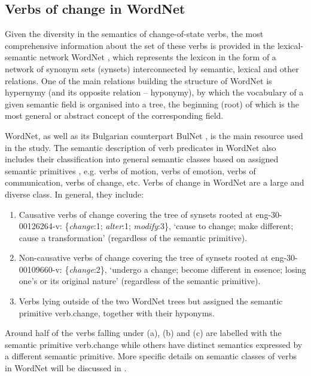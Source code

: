 \documentclass[output=paper,colorlinks,citecolor=brown]{langscibook}
\begin{document}
\subsection{Verbs of change in WordNet}\label{sec:wordnet}

Given the diversity in the semantics of change-of-state verbs, the most comprehensive information about the set of these verbs is provided in the lexical-semantic network WordNet \citep{Miller1995,Fellbaum1998}, which represents the lexicon in the form of a network of synonym sets (synsets) interconnected by semantic, lexical and other relations. One of the main relations building the structure of WordNet is hypernymy (and its opposite relation -- hyponymy), by which the vocabulary of a given semantic field is organised into a tree, the beginning (root) of which is the most general or abstract concept of the corresponding field.

WordNet, as well as its Bulgarian counterpart BulNet \citep{Koeva2006,koeva2021-wordnet}, is the main resource used in the study. The semantic description of verb predicates in WordNet also includes their classification into general semantic classes based on assigned semantic primitives \citep{MillerFellbaum2007}, e.g. verbs of motion, verbs of emotion, verbs of communication, verbs of change, etc. Verbs of change in WordNet are a large and diverse class. In general, they include:

\begin{enumerate}[label=(\alph*)]
\item Causative verbs of change covering the tree of synsets rooted at eng-30-00126264-v: \{\textit{change}:1; \textit{alter}:1; \textit{modify}:3\}, `cause to change; make different; cause a transformation' (regardless of the semantic primitive).
\item Non-causative verbs of change covering the tree of synsets rooted at eng-30-00109660-v: \{\textit{change}:2\}, `undergo a change; become different in essence; losing one's or its original nature’ (regardless of the semantic primitive).
\item Verbs lying outside of the two WordNet trees but assigned the semantic primitive verb.change, together with their hyponyms.
\end{enumerate}

Around half of the verbs falling under (a), (b) and (c) are labelled with the semantic primitive verb.change \citep{LesevaStoyanova2021change} while others have distinct semantics expressed by a different semantic primitive. More specific details on semantic classes of verbs in WordNet will be discussed in .
\end{document}
